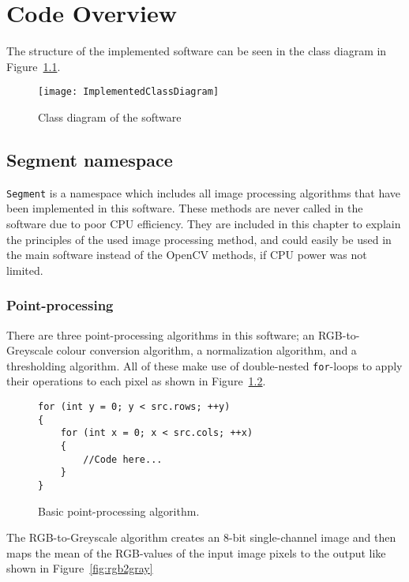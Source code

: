 \chapter{Code Overview}\label{ch:codeover}

The structure of the implemented software can be seen in the class diagram in Figure~\ref{fig:implementedClassDiagram}.

\begin{figure}
	\centering
	\texttt{[image: ImplementedClassDiagram]}
	\caption{Class diagram of the software \label{fig:implementedClassDiagram}}
	
\end{figure}


\section{Segment namespace}
\texttt{Segment} is a namespace which includes all image processing algorithms that have been implemented in this software. These methods are never called in the software due to poor CPU efficiency. They are included in this chapter to explain the principles of the used image processing method, and could easily be used in the main software instead of the OpenCV methods, if CPU power was not limited.

\subsection{Point-processing}
There are three point-processing algorithms in this software; an RGB-to-Greyscale colour conversion algorithm, a normalization algorithm, and a thresholding algorithm. All of these make use of double-nested \texttt{for}-loops to apply their operations to each pixel as shown in Figure~\ref{fig:pointprocess}.
\begin{figure}[!h]
\begin{lstlisting}
for (int y = 0; y < src.rows; ++y)
{
	for (int x = 0; x < src.cols; ++x)
	{
		//Code here...
	}
}
\end{lstlisting}
\caption{Basic point-processing algorithm. \label{fig:pointprocess}}
\end{figure} 

The RGB-to-Greyscale algorithm creates an 8-bit single-channel image and then maps the mean of the RGB-values of the input image pixels to the output like shown in Figure~\ref{fig:rgb2gray}

